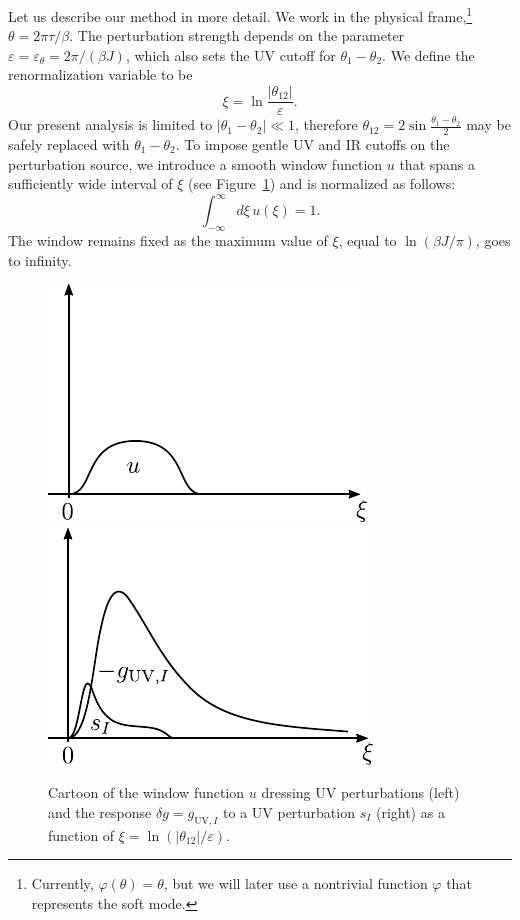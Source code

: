 \documentclass[12pt]{article}
\newcommand{\UV}{\text{UV}}
\newcommand{\vep}{\varepsilon}
\newcommand{\vp}{\varphi}
\begin{document}
Let us describe our method in more detail. We work in the physical frame,\footnote{Currently, $\vp(\theta)=\theta$, but we will later use a nontrivial function $\vp$ that represents the soft mode.} $\theta=2\pi\tau/\beta$. The perturbation strength depends on the parameter $\vep=\vep_\theta=2\pi/(\beta J)$, which also sets the UV cutoff for $\theta_1-\theta_2$. We define the renormalization variable to be 
\begin{equation} \label{xidef}
\xi=\ln\frac{|\theta_{12}|}{\vep}.
\end{equation}
Our present analysis is limited to $|\theta_1-\theta_2|\ll 1$, therefore $\theta_{12}=2\sin\frac{\theta_1-\theta_2}{2}$ may be safely replaced with $\theta_1-\theta_2$. To impose gentle UV and IR cutoffs on the perturbation source, we introduce a smooth window function $u$ that spans a sufficiently wide interval of $\xi$ (see Figure~\ref{fig: softsch}) and is normalized as follows:
\begin{equation}
\int_{-\infty}^{\infty}d \xi \, u(\xi)=1.
\end{equation}
The window remains fixed as the maximum value of $\xi$, equal to $\ln(\beta J/\pi)$, goes to infinity.

\begin{figure}
\centerline{\includegraphics{window.pdf} \qquad \qquad \includegraphics{response.pdf}}
\caption{Cartoon of the window function $u$ dressing UV perturbations (left) and the response $\delta g=g_{\UV,I}$ to a UV perturbation $s_{I}$ (right) as a function of $\xi=\ln(|\theta_{12}|/\vep)$.}\label{fig: softsch}
\end{figure}
\end{document}
